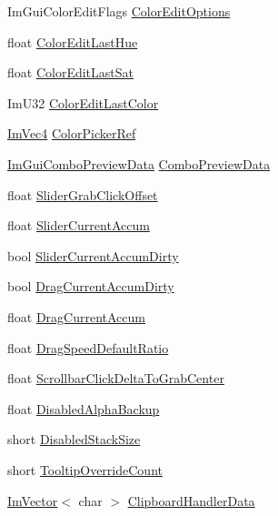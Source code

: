 \begin{DoxyCompactItemize}
\item 
Im\+Gui\+Color\+Edit\+Flags \hyperlink{structImGuiContext_a122394766b40cdb6cbd8a40fbe6ac680}{Color\+Edit\+Options}
\item 
float \hyperlink{structImGuiContext_ade0cf1b5cc1f4f0ff3c9b11d6d7891d3}{Color\+Edit\+Last\+Hue}
\item 
float \hyperlink{structImGuiContext_ad0086b7953d297b854643c51bfaa5fd1}{Color\+Edit\+Last\+Sat}
\item 
Im\+U32 \hyperlink{structImGuiContext_ace0c2c7f35f8526148179465b1c87adb}{Color\+Edit\+Last\+Color}
\item 
\hyperlink{structImVec4}{Im\+Vec4} \hyperlink{structImGuiContext_ae3a119a9a71b31ede7ccc87447627b68}{Color\+Picker\+Ref}
\item 
\hyperlink{structImGuiComboPreviewData}{Im\+Gui\+Combo\+Preview\+Data} \hyperlink{structImGuiContext_a9df05c31c613ac0093ed4171c0ac8f0e}{Combo\+Preview\+Data}
\item 
float \hyperlink{structImGuiContext_a9009d501a2af6783bb4dd3a59b45f6b7}{Slider\+Grab\+Click\+Offset}
\item 
float \hyperlink{structImGuiContext_a44af675b4e2e615fe768cd5ce677c34e}{Slider\+Current\+Accum}
\item 
bool \hyperlink{structImGuiContext_a5e31703c42698a572be557ec57c5cbe7}{Slider\+Current\+Accum\+Dirty}
\item 
bool \hyperlink{structImGuiContext_a2a465bca097a53eba66b613d01765636}{Drag\+Current\+Accum\+Dirty}
\item 
float \hyperlink{structImGuiContext_a524267e65a0b5c3c96a2b629902b4db2}{Drag\+Current\+Accum}
\item 
float \hyperlink{structImGuiContext_aea2d961c03a1d0879088385d8cf602dd}{Drag\+Speed\+Default\+Ratio}
\item 
float \hyperlink{structImGuiContext_a2922e36c1eed77cc0ec707e9771cf07a}{Scrollbar\+Click\+Delta\+To\+Grab\+Center}
\item 
float \hyperlink{structImGuiContext_a3fcd07940c700bf8b106e414d28db79c}{Disabled\+Alpha\+Backup}
\item 
short \hyperlink{structImGuiContext_a4d61d8b3551b138a415455d74a44521b}{Disabled\+Stack\+Size}
\item 
short \hyperlink{structImGuiContext_ae73720b1df3224bb90d0c860dc090f01}{Tooltip\+Override\+Count}
\item 
\hyperlink{structImVector}{Im\+Vector}$<$ char $>$ \hyperlink{structImGuiContext_aadf9cd99ab2805e433e09214742fcbc5}{Clipboard\+Handler\+Data}

\end{DoxyCompactItemize}
